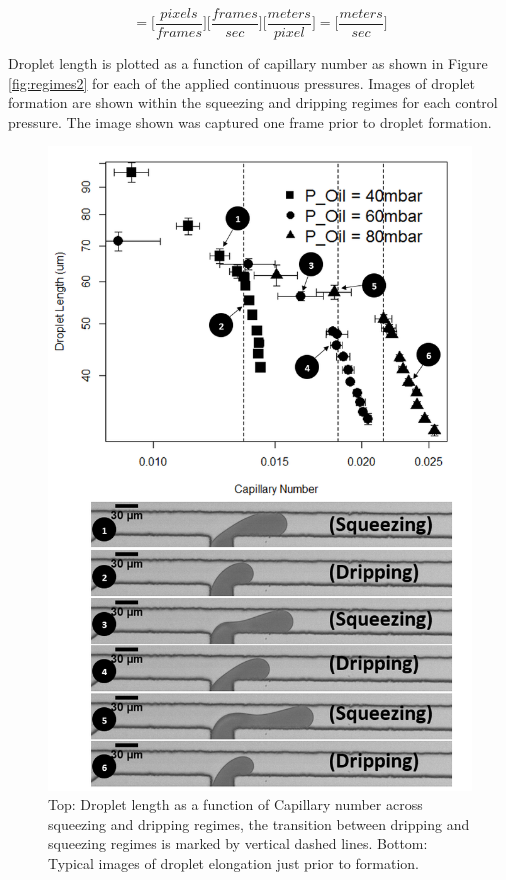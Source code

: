 \begin{equation}
[u] = \Big[\frac{pixels}{frames}\Big] \Big[\frac{frames}{sec}\Big] \Big[\frac{meters}{pixel}\Big] = \Big[\frac{meters}{sec}\Big]
\label{eq:velocity}
\end{equation}

Droplet length is plotted as a function of capillary number as shown in Figure \vref{fig:regimes2} for each of the applied continuous pressures. Images of droplet formation are shown within the squeezing and dripping regimes for each control pressure. The image shown was captured one frame prior to droplet formation. 

\begin{figure}[H]
\centering 
\includegraphics[width=0.75\columnwidth]{regimes2.PNG} 
\caption[Droplet length as a function of Capillary number across squeezing and dripping regimes]{Top: Droplet length as a function of Capillary number across squeezing and dripping regimes, the transition between dripping and squeezing regimes is marked by vertical dashed lines. Bottom: Typical images of droplet elongation just prior to formation.} 
\label{fig:regimes2} 
\end{figure}

